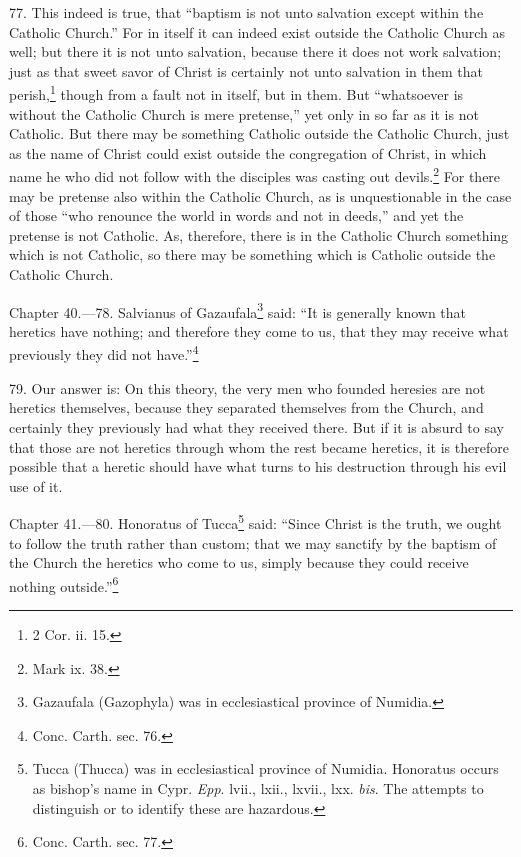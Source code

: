 77. This indeed is true, that ``baptism is not unto salvation except within the Catholic Church.'' For in itself it can indeed exist outside the Catholic Church as well; but there it is not unto salvation, because there it does not work salvation; just as that sweet savor of Christ is certainly not unto salvation in them that perish,\footnote{\par  2 Cor. ii. 15.} though from a fault not in itself, but in them. But ``whatsoever is without the Catholic Church is mere pretense,'' yet only in so far as it is not Catholic. But there may be something Catholic outside the Catholic Church, just as the name of Christ could exist outside the congregation of Christ, in which name he who did not follow with the disciples was casting out devils.\footnote{\par  Mark ix. 38.} For there may be pretense also within the Catholic Church, as is unquestionable in the case of those ``who renounce the world in words and not in deeds,'' and yet the pretense is not Catholic. As, therefore, there is in the Catholic Church something which is not Catholic, so there may be something which is Catholic outside the Catholic Church.


Chapter 40.—78. Salvianus of Gazaufala\footnote{\par  Gazaufala (Gazophyla) was in ecclesiastical province of Numidia.} said: ``It is generally known that heretics have nothing; and therefore they come to us, that they may receive what previously they did not have.''\footnote{\par  Conc. Carth. sec. 76.}

79. Our answer is: On this theory, the very men who founded heresies are not heretics themselves, because they separated themselves from the Church, and certainly they previously had what they received there. But if it is absurd to say that those are not heretics through whom the rest became heretics, it is therefore possible that a heretic should have what turns to his destruction through his evil use of it.


Chapter 41.—80. Honoratus of Tucca\footnote{\par  Tucca (Thucca) was in ecclesiastical province of Numidia. Honoratus occurs as bishop’s name in Cypr. \emph{Epp}. lvii., lxii., lxvii., lxx. \emph{bis}. The attempts to distinguish or to identify these are hazardous.} said: ``Since Christ is the truth, we ought to follow the truth rather than custom; that we may sanctify by the baptism of the Church the heretics who come to us, simply because they could receive nothing outside.''\footnote{\par  Conc. Carth. sec. 77.}

